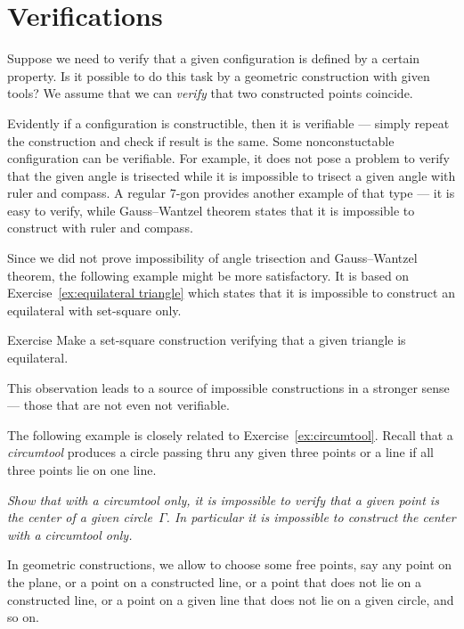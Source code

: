 \section*{Verifications}

Suppose we need to verify that a given configuration is defined by a certain property. 
Is it possible to do this task by a geometric construction with given tools?
We assume that we can \emph{verify} that two constructed points coincide.

Evidently if a configuration is constructible, then it is verifiable --- simply repeat the construction and check if result is the same.
Some nonconstuctable configuration can be verifiable.
For example, it does not pose a problem to verify that the given angle is trisected while it is impossible to trisect a given angle with ruler and compass.
A regular 7-gon provides another example of that type --- it is easy to verify, while Gauss--Wantzel theorem states that it is impossible to construct with ruler and compass.

Since we did not prove impossibility of angle trisection and Gauss--Wantzel theorem, the following example might be more satisfactory.
It is based on Exercise~\ref{ex:equilateral triangle} which states that it is impossible to construct an equilateral with set-square only.

\begin{thm}{Exercise}\label{ex:equilateral triangle-verify}
Make a set-square construction verifying that a given triangle is equilateral.
\end{thm}

This observation leads to a source of impossible constructions in a stronger sense --- those that are not even not verifiable.

The following example is closely related to Exercise~\ref{ex:circumtool}.
Recall that a \emph{circumtool} produces a circle passing thru any given three points
or a line if all three points lie on one line.


\textit{Show that with a circumtool only,
it is impossible to verify that a given point is the center of a given circle~$\Gamma$. In particular it is impossible to construct the center with a circumtool only.}
\medskip

In geometric constructions, we allow to choose some free points,
say any point on the plane, or a point on a constructed line, or a point that does not lie on a constructed line, 
or a point on a given line that does not lie on a given circle, and so on.

